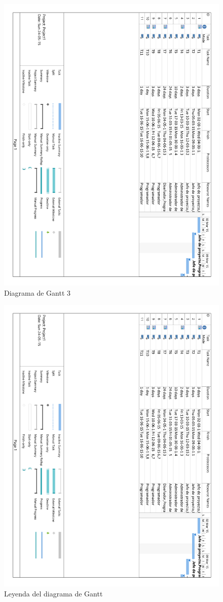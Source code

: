 \begin{figure}[!htp]
	\centering
	\includegraphics[page=3, scale=.7]{fig/gantt_diagram}
	\caption{Diagrama de Gantt 3}
\end{figure}

\begin{figure}[!htp]
	\centering
	\includegraphics[page=4, scale=.7]{fig/gantt_diagram}
	\caption{Leyenda del diagrama de Gantt}
\end{figure}